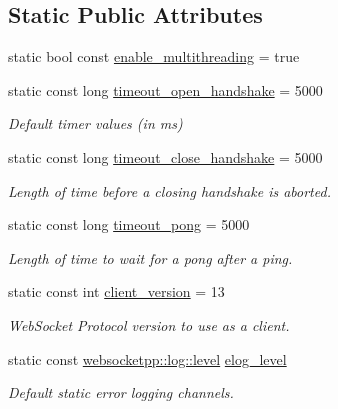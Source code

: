 \subsection*{Static Public Attributes}
\begin{DoxyCompactItemize}
\item 
static bool const \hyperlink{structwebsocketpp_1_1config_1_1debug__core_acbf3aa1de5fc4dacbdb7866375791409}{enable\+\_\+multithreading} = true
\item 
static const long \hyperlink{structwebsocketpp_1_1config_1_1debug__core_a99182b8a1b9b1d62075d414705165117}{timeout\+\_\+open\+\_\+handshake} = 5000
\begin{DoxyCompactList}\small\item\em Default timer values (in ms) \end{DoxyCompactList}\item 
static const long \hyperlink{structwebsocketpp_1_1config_1_1debug__core_abb65f538323f3f7c58378d973fd7dcec}{timeout\+\_\+close\+\_\+handshake} = 5000
\begin{DoxyCompactList}\small\item\em Length of time before a closing handshake is aborted. \end{DoxyCompactList}\item 
static const long \hyperlink{structwebsocketpp_1_1config_1_1debug__core_a5d7acfccc65f4a8146b223d101ed1c7b}{timeout\+\_\+pong} = 5000
\begin{DoxyCompactList}\small\item\em Length of time to wait for a pong after a ping. \end{DoxyCompactList}\item 
static const int \hyperlink{structwebsocketpp_1_1config_1_1debug__core_a2749c03e9600b76c6ee5c1184919f2f7}{client\+\_\+version} = 13
\begin{DoxyCompactList}\small\item\em Web\+Socket Protocol version to use as a client. \end{DoxyCompactList}\item 
static const \hyperlink{namespacewebsocketpp_1_1log_a12d4d17939f102db8c9183d400a41960}{websocketpp\+::log\+::level} \hyperlink{structwebsocketpp_1_1config_1_1debug__core_a0f2c26586b53faefef4386473092886e}{elog\+\_\+level}
\begin{DoxyCompactList}\small\item\em Default static error logging channels. \end{DoxyCompactList}\item 

\end{DoxyCompactItemize}
